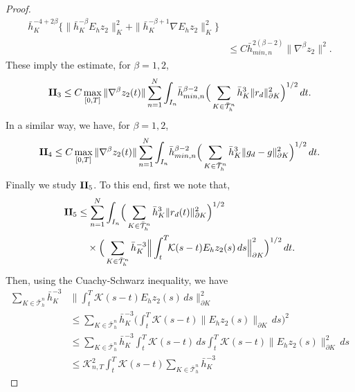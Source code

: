\documentclass{amsart}
\numberwithin{equation}{section}
\theoremstyle{definition}
\begin{document}
\begin{proof}
\begin{equation*}
\begin{split}
       \bar h_K^{-4+2\beta} 
       \big\{ \| \bar h_K^{-\beta} E_hz_2\|_K^2 
       + \|\bar h_K^{-\beta+1} \nabla E_hz_2\|_K^2 \big\}\\
     &\leq C \bar h_{min,n}^{2(\beta-2)} \| \nabla^\beta z_2 \|^2.
  \end{split}
\end{equation*}
These imply the estimate, for $\beta=1,2$,
\begin{equation}   \label{II3}
  {\rm{\bf II}}_3
   \le C
     \max_{[0,T]}\|\nabla^\beta z_2(t)\|
     \sum_{n=1}^N\int_{I_n}\!\bar h_{min,n}^{\beta-2}
     \Big(\sum_{K\in\bar{\mathcal T}_h^n}\bar h_K^3
       \|r_d\|_{\partial K}^2\Big)^{1/2}\,dt.
\end{equation}
In a similar way, we have, for $\beta=1,2$,
\begin{equation}   \label{II4}
  {\rm{\bf II}}_4
   \le C
     \max_{[0,T]}\|\nabla^\beta z_2(t)\|
     \sum_{n=1}^N\int_{I_n}\!\bar h_{min,n}^{\beta-2}
     \Big(\sum_{K\in\bar{\mathcal T}_h^n}\bar h_K^3
       \|g_d-g\|_{\partial K}^2\Big)^{1/2}\,dt.
\end{equation}
Finally we study ${\rm{\bf II}}_5$. 
To this end, first we note that,
\begin{equation*} 
  \begin{split}
    {\rm{\bf II}}_5
     &\le \sum_{n=1}^N\int_{I_n}\!
     \Big(\sum_{K\in\bar{\mathcal T}_h^n}
      \bar h_K^3\|r_d(t)\|_{\partial K}^2\Big)^{1/2}\\
     &\quad \times
      \Big(\sum_{K\in\bar{\mathcal T}_h^n}\bar h_K^{-3}
       \Big\|\int_t^T\! \!{\mathcal K}(s-t)E_hz_2(s)\,ds
       \Big\|_{\partial K}^2\Big)^{1/2} \,dt.
  \end{split}
\end{equation*}
Then, using the Cuachy-Schwarz inequality, 
we have
\begin{equation*}
  \begin{split}
   \sum_{K\in\bar{\mathcal T}_h^n}\bar h_K^{-3}
       &\Big\|\int_t^T\!{\mathcal K}(s-t)E_hz_2(s)\,ds
        \Big\|_{\partial K}^2\\
       &\le\sum_{K\in\bar{\mathcal T}_h^n}\bar h_K^{-3}
        \Big(\int_t^T\!\!{\mathcal K}(s-t)\|E_hz_2(s)\|_{\partial K}\,ds
        \Big)^2\\
       &\le \sum_{K\in\bar{\mathcal T}_h^n}\bar h_K^{-3}
        \int_t^T\!{\mathcal K}(s-t)\,ds
        \int_t^T\!{\mathcal K}(s-t)\|E_hz_2(s)\|_{\partial K}^2\,ds\\
       &\le {\mathcal K}_{n,T}^2
        \int_t^T\!\!{\mathcal K}(s-t)\sum_{K\in\bar{\mathcal T}_h^n}\bar h_K^{-3}

\end{split}
\end{equation*}
\end{proof}
\end{document}
